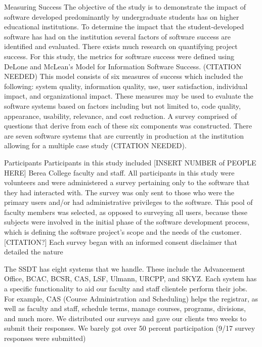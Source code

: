 Measuring Success
The objective of the study is to demonstrate the impact of software developed predominantly by undergraduate students has on higher educational institutions. To determine the impact that the student-developed software has had on the institution several factors of software success are identified and evaluated.  There exists much research on quantifying project success. For this study, the metrics for software success were defined using DeLone and McLean’s Model for Information Software Success. (CITATION NEEDED) This model consists of six measures of success which included the following: system quality, information quality, use, user satisfaction, individual impact, and organizational impact. These measures may be used to evaluate the software systems based on factors including but not limited to, code quality, appearance, usability, relevance, and cost reduction.  A survey comprised of questions that derive from each of these six components was constructed. There are seven software systems that are currently in production at the institution allowing for a multiple case study (CITATION NEEDED).

    Participants
Participants in this study included [INSERT NUMBER of PEOPLE HERE] Berea College faculty and staff. All participants in this study were volunteers and were administered a survey pertaining only to the software that they had interacted with. The survey was only sent to those who were the primary users and/or had administrative privileges to the software. This pool of faculty members was selected, as opposed to surveying all users, because these subjects were involved in the initial phase of the software development process, which is defining the software project’s scope and the needs of the customer. [CITATION?] Each survey began with an informed consent disclaimer that detailed the nature

The SSDT has eight systems that we handle. These include the Advancement Office, BCAC, BCSR, CAS, LSF, Ulmann, URCPP, and SKYZ. Each system has a specific functionality to aid our faculty and staff clientele perform their jobs. For example, CAS (Course Administration and Scheduling) helps the registrar, as well as faculty and staff, schedule terms, manage courses, programs, divisions, and much more.
We distributed our surveys and gave our clients two weeks to submit their responses. We barely got over 50 percent participation (9/17 survey responses were submitted)


